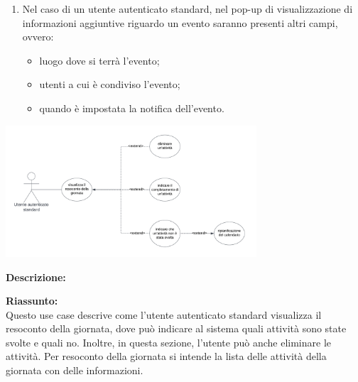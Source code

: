 \begin{listaPersonale}[UC]{}
\begin{enumerate}
\begin{itemize}
              \end{itemize}
        \item Nel caso di un utente autenticato standard, nel pop-up di visualizzazione di informazioni aggiuntive riguardo un evento saranno presenti altri campi, ovvero:
              \begin{itemize}
                  \item luogo dove si terrà l'evento;
                  \item utenti a cui è condiviso l'evento;
                  \item quando è impostata la notifica dell'evento.
              \end{itemize}
    \end{enumerate}





    \newpage


    \begin{center}
        \includegraphics[width=0.7\textwidth]{img/Diagrammi/UseCases/ResocontoGiornata.png}
    \end{center}

    \textbf{Descrizione:}

    \textbf{Riassunto:} \\
    Questo use case descrive come l'utente autenticato standard visualizza il resoconto della giornata, dove può indicare al sistema quali attività sono state svolte e quali no. Inoltre, in questa sezione, l'utente può anche eliminare le attività. Per resoconto della giornata si intende la lista delle attività della giornata con delle informazioni.


\end{listaPersonale}
